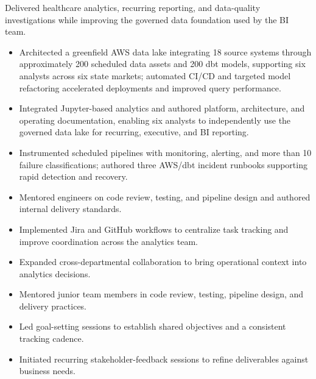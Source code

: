 Delivered healthcare analytics, recurring reporting, and data-quality investigations while improving the governed data foundation used by the BI team.
\begin{itemize}
  \item Architected a greenfield AWS data lake integrating 18 source systems through approximately 200 scheduled data assets and 200 dbt models, supporting six analysts across six state markets; automated CI/CD and targeted model refactoring accelerated deployments and improved query performance.
  \item Integrated Jupyter-based analytics and authored platform, architecture, and operating documentation, enabling six analysts to independently use the governed data lake for recurring, executive, and BI reporting.
  \item Instrumented scheduled pipelines with monitoring, alerting, and more than 10 failure classifications; authored three AWS/dbt incident runbooks supporting rapid detection and recovery.
  \item Mentored engineers on code review, testing, and pipeline design and authored internal delivery standards.
  \item Implemented Jira and GitHub workflows to centralize task tracking and improve coordination across the analytics team.
  \item Expanded cross-departmental collaboration to bring operational context into analytics decisions.
  \item Mentored junior team members in code review, testing, pipeline design, and delivery practices.
  \item Led goal-setting sessions to establish shared objectives and a consistent tracking cadence.
  \item Initiated recurring stakeholder-feedback sessions to refine deliverables against business needs.
\end{itemize}

